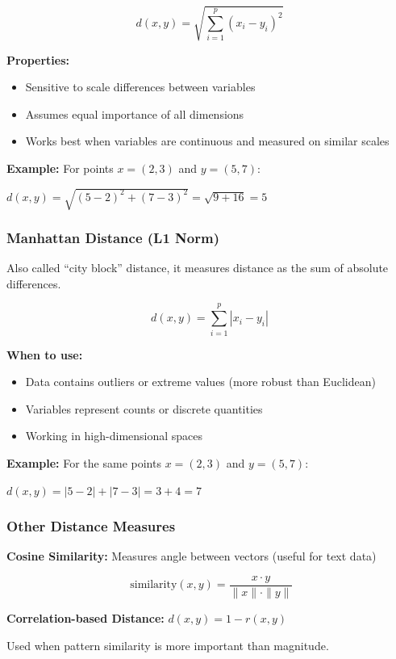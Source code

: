 \documentclass[
]{article}
\begin{document}
\[d(x,y) = \sqrt{\sum_{i = 1}^{p}\left( x_{i} - y_{i} \right)^{2}}\]

\textbf{Properties:}

\begin{itemize}
\item
  Sensitive to scale differences between variables
\item
  Assumes equal importance of all dimensions
\item
  Works best when variables are continuous and measured on similar
  scales
\end{itemize}

\textbf{Example: } For points \(x = (2,3)\) and \(y = (5,7)\):

\(d(x,y) = \sqrt{(5 - 2)^{2} + (7 - 3)^{2}} = \sqrt{9 + 16} = 5\)

\subsubsection{Manhattan Distance (L1 Norm)}

Also called ``city block'' distance, it measures distance as the sum of
absolute differences.

\[d(x,y) = \sum_{i = 1}^{p}|x_{i} - y_{i}|\]

\textbf{When to use:}

\begin{itemize}
\item
  Data contains outliers or extreme values (more robust than Euclidean)
\item
  Variables represent counts or discrete quantities
\item
  Working in high-dimensional spaces
\end{itemize}

\textbf{Example: } For the same points \(x = (2,3)\) and \(y = (5,7)\):

\(d(x,y) = |5 - 2| + |7 - 3| = 3 + 4 = 7\)

\subsubsection{Other Distance Measures}

\textbf{Cosine Similarity:} Measures angle between vectors (useful for
text data)

\[\text{ similarity}(x,y) = \frac{x \cdot y}{\| x\| \cdot \| y\|}\]

\textbf{Correlation-based Distance:} \(d(x,y) = 1 - r(x,y)\)

Used when pattern similarity is more important than magnitude.
\end{document}
